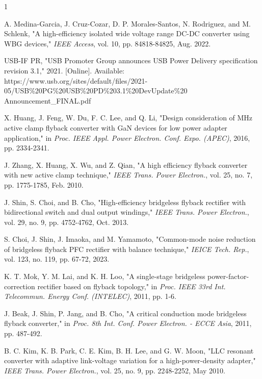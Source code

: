 \documentclass[lettersize,journal]{IEEEtran}
\begin{document}






\begin{thebibliography}{1}


A. Medina-Garcia, J. Cruz-Cozar, D. P. Morales-Santos, N. Rodriguez, and M. Schlenk, "A high-efficiency isolated wide voltage range DC-DC converter using WBG devices," \textit{IEEE Access}, vol. 10, pp. 84818-84825, Aug. 2022.

USB-IF PR, "USB Promoter Group announces USB Power Delivery specification revision 3.1," 2021. [Online]. Available: https://www.usb.org/sites/default/files/2021-05/USB\%20PG\%20USB\%20PD\%203.1\%20DevUpdate\%20\\Announcement\_FINAL.pdf

X. Huang, J. Feng, W. Du, F. C. Lee, and Q. Li, "Design consideration of MHz active clamp flyback converter with GaN devices for low power adapter application," in \textit{Proc. IEEE Appl. Power Electron. Conf. Expo. (APEC)}, 2016, pp. 2334-2341.

J. Zhang, X. Huang, X. Wu, and Z. Qian, "A high efficiency flyback converter with new active clamp technique," \textit{IEEE Trans. Power Electron.}, vol. 25, no. 7, pp. 1775-1785, Feb. 2010.


J. Shin, S. Choi, and B. Cho, "High-efficiency bridgeless flyback rectifier with bidirectional switch and dual output windings," \textit{IEEE Trans. Power Electron.}, vol. 29, no. 9, pp. 4752-4762, Oct. 2013.

S. Choi, J. Shin, J. Imaoka, and M. Yamamoto, "Common-mode noise reduction of bridgeless flyback PFC rectifier with balance technique," \textit{IEICE Tech. Rep.}, vol. 123, no. 119, pp. 67-72, 2023.

K. T. Mok, Y. M. Lai, and K. H. Loo, "A single-stage bridgeless power-factor-correction rectifier based on flyback topology," in \textit{Proc. IEEE 33rd Int. Telecommun. Energy Conf. (INTELEC)}, 2011, pp. 1-6.

J. Beak, J. Shin, P. Jang, and B. Cho, "A critical conduction mode bridgeless flyback converter," in \textit{Proc. 8th Int. Conf. Power Electron. - ECCE Asia}, 2011, pp. 487-492.

B. C. Kim, K. B. Park, C. E. Kim, B. H. Lee, and G. W. Moon, "LLC resonant converter with adaptive link-voltage variation for a high-power-density adapter," \textit{IEEE Trans. Power Electron.}, vol. 25, no. 9, pp. 2248-2252, May 2010.


\end{thebibliography}
\end{document}
